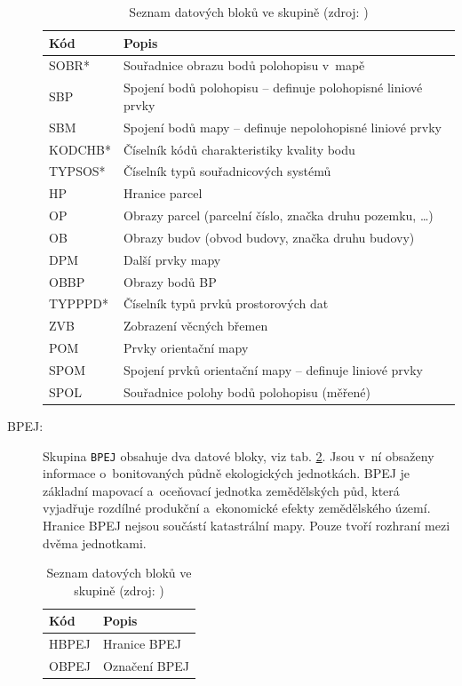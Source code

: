 \documentclass[a4paper,12pt,oneside]{book}
\begin{document}
\begin{description}
\begin{table}[htbp]
\centering
\caption[Seznam datových bloků ve skupině ]{Seznam datových bloků ve skupině  (zdroj: \cite{vfk_struktura})}
\begin{tabular}{ll}
\toprule
\textbf{Kód} & \textbf{Popis} \\ 
\midrule
SOBR* & Souřadnice obrazu bodů polohopisu v~mapě \\ 
SBP & Spojení bodů polohopisu -- definuje polohopisné liniové prvky \\ 
SBM & Spojení bodů mapy -- definuje nepolohopisné liniové prvky \\ 
KODCHB* & Číselník kódů charakteristiky kvality bodu \\ 
TYPSOS* & Číselník typů souřadnicových systémů \\ 
HP & Hranice parcel \\ 
OP & Obrazy parcel (parcelní číslo, značka druhu pozemku, \dots) \\ 
OB & Obrazy budov (obvod budovy, značka druhu budovy) \\ 
DPM & Další prvky mapy \\ 
OBBP & Obrazy bodů BP \\ 
TYPPPD* & Číselník typů prvků prostorových dat \\ 
ZVB & Zobrazení věcných břemen \\ 
POM & Prvky orientační mapy \\ 
SPOM & Spojení prvků orientační mapy -- definuje liniové prvky \\ 
SPOL & Souřadnice polohy bodů polohopisu (měřené) \\  
\bottomrule
\end{tabular}
\label{t_skupina_prvkyKM}
\end{table}
 
\item[BPEJ:] Skupina \texttt{BPEJ} obsahuje dva datové bloky, viz
  tab. \ref{t_skupina_bpej}. Jsou v~ní obsaženy informace
  o~bonitovaných půdně ekologických jednotkách. BPEJ je základní
  mapovací a~oceňovací jednotka zemědělských půd, která vyjadřuje
  rozdílné produkční a~ekonomické efekty zemědělského území. Hranice
  BPEJ nejsou součástí katastrální mapy. Pouze tvoří rozhraní mezi
  dvěma jednotkami. \cite{dp_landa}

\begin{table}[htbp]
\centering
\caption[Seznam datových bloků ve skupině ]{Seznam datových bloků ve skupině  (zdroj: \cite{vfk_struktura})}
\begin{tabular}{ll}
\toprule
\textbf{Kód} & \textbf{Popis} \\ 
\midrule
HBPEJ & Hranice BPEJ \\ 
OBPEJ & Označení BPEJ \\ 
\bottomrule
\end{tabular}
\label{t_skupina_bpej}
\end{table}
 

\end{description}
\end{document}
